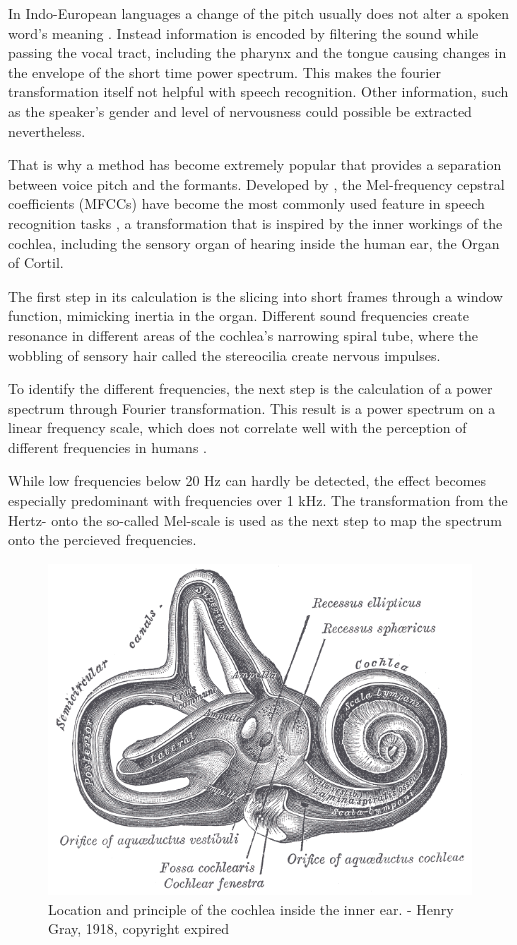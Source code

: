 In Indo-European languages a change of the pitch usually does not alter a spoken word’s meaning \cite{auditoryneuroscience}. Instead information is encoded by filtering the sound while passing the vocal tract, including the pharynx and the tongue causing changes in the envelope of the short time power spectrum. This makes the fourier transformation itself not helpful with speech recognition. Other information, such as the speaker's gender and level of nervousness could possible be extracted nevertheless.

That is why a method has become extremely popular that provides a separation between voice pitch and the formants. Developed by \cite{noll67}, the Mel-frequency cepstral coefficients (MFCCs) have become the most commonly used feature in speech recognition tasks \cite{ganchev2005comparative}, a transformation that is inspired by the inner workings of the cochlea, including the sensory organ of hearing inside the human ear, the Organ of Cortil. 


The first step in its calculation is the slicing into short frames through a window function, mimicking inertia in the organ. Different sound frequencies create resonance in different areas of the cochlea’s narrowing spiral tube, where the wobbling of sensory hair called the stereocilia create nervous impulses.

To identify the different frequencies, the next step is the calculation of a power spectrum through Fourier transformation. This result is a power spectrum on a linear frequency scale, which does not correlate well with the perception of different frequencies in humans \cite{mel}. 

 While low frequencies below 20 Hz can hardly be detected, the effect becomes especially predominant with frequencies over 1 kHz. The transformation from the Hertz- onto the so-called Mel-scale is used as the next step to map the spectrum onto the percieved frequencies. 


\begin{figure}[h]
    \centering
	\includegraphics[width=.8\textwidth]{./images/illustrations/Gray921}
    \caption{Location and principle of the cochlea inside the inner ear. - Henry Gray, 1918, copyright expired}
    \label{fig:gray}
\end{figure}

